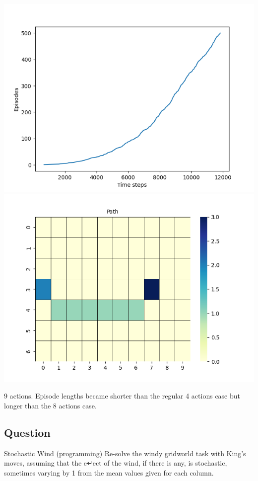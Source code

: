 \documentclass[11pt]{article}
\begin{document}
    \includegraphics[scale=0.4]{figure_6_3_ex_6_9_b}
    \includegraphics[scale=0.4]{figure_6_3_ex_6_9_b_grid}

    9 actions.
    Episode lengths became shorter than the regular 4 actions case but longer than the 8 actions case.

    \subsection{Question}

    Stochastic Wind (programming) Re-solve the windy gridworld task with King’s moves, assuming that the e↵ect of the wind, if there is any, is stochastic, sometimes varying by 1 from the mean values given for each column.
\end{document}
